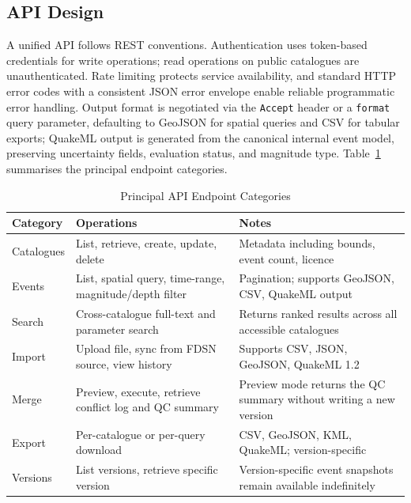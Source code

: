 \documentclass[11pt]{article}
\begin{document}
\subsection{API Design}
A unified API follows REST conventions. Authentication uses token-based credentials for write operations; read operations on public catalogues are unauthenticated. Rate limiting protects service availability, and standard HTTP error codes with a consistent JSON error envelope enable reliable programmatic error handling. Output format is negotiated via the \texttt{Accept} header or a \texttt{format} query parameter, defaulting to GeoJSON for spatial queries and CSV for tabular exports; QuakeML output is generated from the canonical internal event model, preserving uncertainty fields, evaluation status, and magnitude type. Table~\ref{tab:api_endpoints} summarises the principal endpoint categories.

\begin{table}[H]
\centering
\small
\caption{Principal API Endpoint Categories}
\label{tab:api_endpoints}
\setlength{\tabcolsep}{5pt}
\renewcommand{\arraystretch}{1.15}
\begin{tabular}{p{3cm} p{4.5cm} p{5.5cm}}
\toprule
\textbf{Category} & \textbf{Operations} & \textbf{Notes} \\
\midrule
Catalogues & List, retrieve, create, update, delete & Metadata including bounds, event count, licence \\
Events & List, spatial query, time-range, magnitude/depth filter & Pagination; supports GeoJSON, CSV, QuakeML output \\
Search & Cross-catalogue full-text and parameter search & Returns ranked results across all accessible catalogues \\
Import & Upload file, sync from FDSN source, view history & Supports CSV, JSON, GeoJSON, QuakeML 1.2 \\
Merge & Preview, execute, retrieve conflict log and QC summary & Preview mode returns the QC summary without writing a new version \\
Export & Per-catalogue or per-query download & CSV, GeoJSON, KML, QuakeML; version-specific \\
Versions & List versions, retrieve specific version & Version-specific event snapshots remain available indefinitely \\
\bottomrule
\end{tabular}
\end{table}
\end{document}

